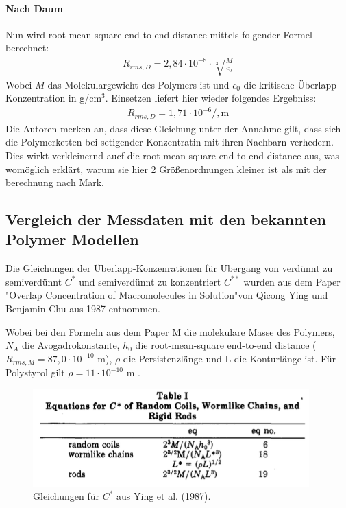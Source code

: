 \paragraph*{Nach Daum}
Nun wird root-mean-square end-to-end distance mittels folgender Formel berechnet:
\begin{gather}
	R_{rms,D} = 2,84 \cdot 10^{-8} \cdot \sqrt[3]{\frac{M}{c_0}}
\end{gather}
Wobei $M$ das Molekulargewicht des Polymers ist und $c_0$ die kritische Überlapp-Konzentration in g/cm$^3$.
Einsetzen liefert hier wieder folgendes Ergebniss:
\begin{gather}
	R_{rms,D} = 1,71 \cdot 10^{-6} /, \text{m}
\end{gather}
Die Autoren merken an, dass diese Gleichung unter der Annahme gilt, dass sich die Polymerketten bei setigender Konzentratin mit ihren Nachbarn verhedern. Dies wirkt verkleinernd aucf die root-mean-square end-to-end distance aus, was womöglich erklärt, warum sie hier 2 Größenordnungen kleiner ist als mit der berechnung nach Mark.

\newpage
\subsection{Vergleich der Messdaten mit den bekannten Polymer Modellen}

Die Gleichungen der Überlapp-Konzenrationen für Übergang von verdünnt zu semiverdünnt $C^*$ und semiverdünnt zu konzentriert $C^{**}$ wurden aus dem Paper "Overlap Concentration of Macromolecules in Solution"von Qicong Ying und Benjamin Chu aus 1987 entnommen.

Wobei bei den Formeln aus dem Paper M die molekulare Masse des Polymers, $N_A$ die Avogadrokonstante, $h_0$ die root-mean-square end-to-end distance ($R_{rms,M} = 87,0 \cdot 10^{-10}$ m), $\rho$ die Persistenzlänge und L die Konturlänge ist.
Für Polystyrol gilt $\rho = 11 \cdot 10^{-10}$ m \citep*{psPers}.

\begin{figure}[h]
	\includegraphics[width=0.95\textwidth]{Bilder/Auswertung/43/YingT1.png}
	\caption[short]{Gleichungen für $C^*$ aus Ying et al. (1987).}
\end{figure}

